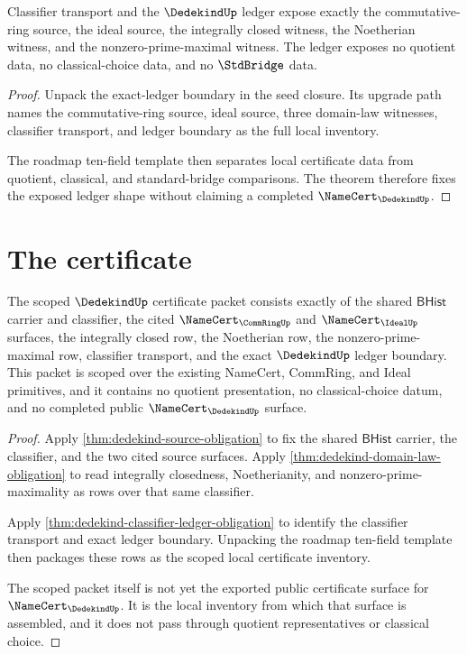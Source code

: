 \begin{theorem}\label{thm:dedekind-classifier-ledger-obligation}
Classifier transport and the $\DedekindUp$ ledger expose exactly the commutative-ring source, the ideal source, the integrally closed witness, the Noetherian witness, and the nonzero-prime-maximal witness. The ledger exposes no quotient data, no classical-choice data, and no $\StdBridge$ data.
\end{theorem}
\begin{proof}
Unpack the exact-ledger boundary in the seed closure. Its upgrade path names the commutative-ring source, ideal source, three domain-law witnesses, classifier transport, and ledger boundary as the full local inventory.

The roadmap ten-field template then separates local certificate data from quotient, classical, and standard-bridge comparisons. The theorem therefore fixes the exposed ledger shape without claiming a completed $\NameCert_{\DedekindUp}$.
\end{proof}

\section{The certificate}
\label{sec:dedekind-certificate}

\begin{theorem}\label{thm:dedekind-scoped-certificate-packet}
The scoped $\DedekindUp$ certificate packet consists exactly of the shared $\mathsf{BHist}$ carrier and classifier, the cited $\NameCert_{\CommRingUp}$ and $\NameCert_{\IdealUp}$ surfaces, the integrally closed row, the Noetherian row, the nonzero-prime-maximal row, classifier transport, and the exact $\DedekindUp$ ledger boundary. This packet is scoped over the existing NameCert, CommRing, and Ideal primitives, and it contains no quotient presentation, no classical-choice datum, and no completed public $\NameCert_{\DedekindUp}$ surface.
\end{theorem}
\begin{proof}
Apply \autoref{thm:dedekind-source-obligation} to fix the shared $\mathsf{BHist}$ carrier, the classifier, and the two cited source surfaces. Apply \autoref{thm:dedekind-domain-law-obligation} to read integrally closedness, Noetherianity, and nonzero-prime-maximality as rows over that same classifier.

Apply \autoref{thm:dedekind-classifier-ledger-obligation} to identify the classifier transport and exact ledger boundary. Unpacking the roadmap ten-field template then packages these rows as the scoped local certificate inventory.

The scoped packet itself is not yet the exported public certificate surface for $\NameCert_{\DedekindUp}$. It is the local inventory from which that surface is assembled, and it does not pass through quotient representatives or classical choice.
\end{proof}

